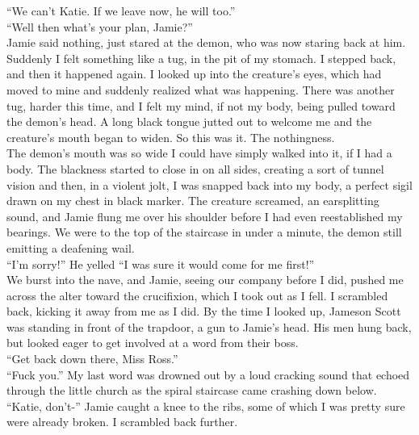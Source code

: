 \documentclass[a5paper]{scrartcl}
\begin{document}
\enquote{We can't Katie. If we leave now, he will too.}\\


\enquote{Well then what's your plan, Jamie?}\\


Jamie said nothing, just stared at the demon, who was now staring back at him. Suddenly I felt something like a tug, in the pit of my stomach. I stepped back, and then it happened again. I looked up into the creature's eyes, which had moved to mine and suddenly realized what was happening. There was another tug, harder this time, and I felt my mind, if not my body, being pulled toward the demon's head. A long black tongue jutted out to welcome me and the creature's mouth began to widen. So this was it. The nothingness.\\


The demon's mouth was so wide I could have simply walked into it, if I had a body. The blackness started to close in on all sides, creating a sort of tunnel vision and then, in a violent jolt, I was snapped back into my body, a perfect sigil drawn on my chest in black marker. The creature screamed, an earsplitting sound, and Jamie flung me over his shoulder before I had even reestablished my bearings. We were to the top of the staircase in under a minute, the demon still emitting a deafening wail. \\


\enquote{I'm sorry!} He yelled \enquote{I was sure it would come for me first!}\\


We burst into the nave, and Jamie, seeing our company before I did, pushed me across the alter toward the crucifixion, which I took out as I fell. I scrambled back, kicking it away from me as I did. By the time I looked up, Jameson Scott was standing in front of the trapdoor, a gun to Jamie's head. His men hung back, but looked eager to get involved at a word from their boss. \\


\enquote{Get back down there, Miss Ross.} \\


\enquote{Fuck you.} My last word was drowned out by a loud cracking sound that echoed  through the little church as the spiral staircase came crashing down below. \\


\enquote{Katie, don't-} Jamie caught a knee to the ribs, some of which I was pretty sure were already broken. I scrambled back further. \\
\end{document}
